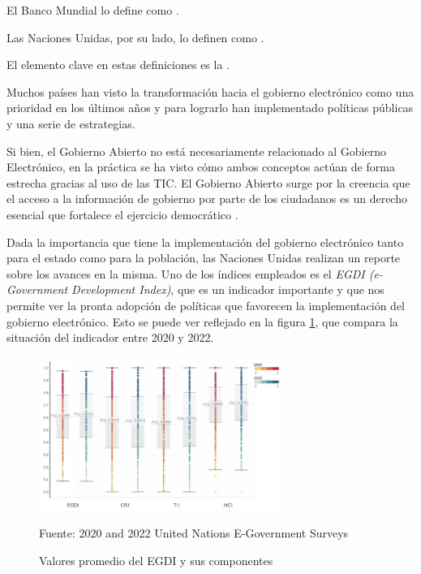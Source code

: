 El Banco Mundial lo define como .

Las Naciones Unidas, por su lado, lo definen como .

El elemento clave en estas definiciones es la .

Muchos países han visto la transformación hacia el gobierno electrónico como una prioridad en los últimos años y para lograrlo han implementado políticas públicas y una serie de estrategias.

Si bien, el Gobierno Abierto no está necesariamente relacionado al Gobierno Electrónico, en la práctica se ha visto cómo ambos conceptos actúan de forma estrecha gracias al uso de las TIC. El Gobierno Abierto surge por la creencia que el acceso a la información de gobierno por parte de los ciudadanos es un derecho esencial que fortalece el ejercicio democrático \cite[13]{naserGobiernoElectronicoGestion2011}.

Dada la importancia que tiene la implementación del gobierno electrónico tanto para el estado como para la población, las Naciones Unidas realizan un reporte sobre los avances en la misma. Uno de los índices empleados es el \textit{EGDI (e-Government Development Index)}, que es un indicador importante y que nos permite ver la pronta adopción de políticas que favorecen la implementación del gobierno electrónico. Esto se puede ver reflejado en la figura \ref{fig:egdi2020_2022}, que compara la situación del indicador entre 2020 y 2022.

\begin{figure}[!h]
    \centering
    \includegraphics[width=0.7\textwidth]{assets/egdi2020_2022}
    \caption{Valores promedio del EGDI y sus componentes}{Fuente: 2020 and 2022 United Nations E-Government Surveys}
    \label{fig:egdi2020_2022}
\end{figure}

